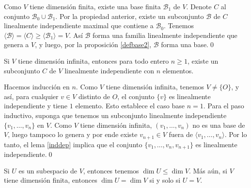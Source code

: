 \dem Como $V$ tiene dimensi\'on finita, existe una base finita $\mathcal{B}_1$ de $V$. Denote $C$ al conjunto $\mathcal{B}_0\cup \mathcal{B}_1$. Por la propiedad anterior, existe un subconjunto $\mathcal{B}$ de $C$ linealmente independiente maximal que contiene a $\mathcal{B}_0$. Tenemos $\langle \mathcal{B}\rangle=\langle C \rangle\ge\langle \mathcal{B}_1\rangle=V$. As\'i $\mathcal{B}$ forma una familia linealmente independiente que genera a $V$, y luego, por la proposici\'on \ref{defbase2}, $\mathcal{B}$ forma una base.\qed

\begin{lema}
Si $V$ tiene dimensi\'on infinita, entonces para todo entero $n\ge 1$, existe un subconjunto $C$ de $V$ linealmente independiente con $n$ elementos.
\end{lema}

\dem Hacemos inducci\'on en $n$. Como $V$ tiene dimensi\'on infinita, tenemos $V\ne\{O\}$, y as\'i, para cualquier $v\in V$ distinto de $O$, el conjunto $\{v\}$ es linealmente independiente y tiene $1$ elemento. Esto establece el caso base $n=1$. Para el paso inductivo, suponga que tenemos un subconjunto linealmente independiente $\{v_1,\ldots,v_n\}$ en $V$. Como $V$ tiene dimensi\'on infinita, $(v_1,\ldots,v_n)$ no es una base de $V$, luego tampoco lo genera y por ende existe $v_{n+1}\in V$ fuera de $\langle v_1,\ldots,v_n\rangle$. Por lo tanto, el lema \ref{inddep} implica que el conjunto $\{v_1,\ldots,v_n,v_{n+1}\}$ es linealmente independiente.\qed

\begin{teo}\label{monodim}
Si $U$ es un subespacio de $V$, entonces tenemos $\dim U\le \dim V$. M\'as a\'un, si $V$ tiene dimensi\'on finita, entonces $\dim U=\dim V$ si y solo si $U=V$.
\end{teo}


